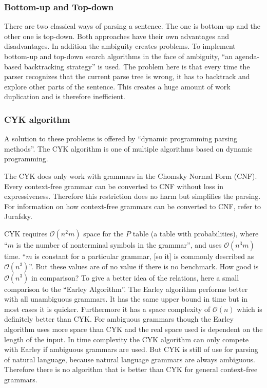 \documentclass[12pt,twoside]{scrartcl}
\theoremstyle{plain}
\theoremstyle{definition}
\theoremstyle{remark}
\begin{document}
		\subsubsection*{Bottom-up and Top-down}
		\label{subSubSec:bottomUpTopDown}
		
		There are two classical ways of parsing a sentence. The one is bottom-up and the other one is top-down. Both approaches have their own advantages and disadvantages. In addition the ambiguity creates problems. To implement bottom-up and top-down search algorithms in the face of ambiguity, ``an agenda-based backtracking strategy''\cite[p.~468]{Jurafsky2009b} is used. The problem here is that every time the parser recognizes that the current parse tree is wrong, it has to backtrack and explore other parts of the sentence. This creates a huge amount of work duplication and is therefore inefficient.
		
		\subsubsection*{CYK algorithm}
		\label{subSubSec:cykAlgorithm}		
		
		A solution to these problems is offered by ``dynamic programming parsing methods''\cite[p.~469]{Jurafsky2009b}. The CYK algorithm is one of multiple algorithms based on dynamic programming.
		
		The CYK does only work with grammars in the Chomsky Normal Form (CNF). Every context-free grammar can be converted to CNF without loss in expressiveness. Therefore this restriction does no harm but simplifies the parsing. For information on how context-free grammars can be converted to CNF, refer to Jurafsky\cite{Jurafsky2009b}.
		
		CYK requires $\mathcal{O}(n^{2}m)$ space for the $P$ table (a table with probabilities), where ``$m$ is the number of nonterminal symbols in the grammar''\cite[p.~893]{Russel2010}, and uses $\mathcal{O}(n^{3}m)$ time. ``$m$ is constant for a particular grammar, [so it] is commonly described as $\mathcal{O}(n^{3})$''\cite[p.~893]{Russel2010}. But these values are of no value if there is no benchmark. How good is $\mathcal{O}(n^{3})$ in comparison? To give a better idea of the relations, here a small comparison to the ``Earley Algorithm''\cite[p.~477]{Jurafsky2009b}. The Earley algorithm performs better with all unambiguous grammars.\cite{Li} It has the same upper bound in time but in most cases it is quicker. Furthermore it has a space complexity of $\mathcal{O}(n)$ which is definitely better than CYK.\cite{Li} For ambiguous grammars though the Earley algorithm uses more space than CYK and the real space used is dependent on the length of the input.\cite{Li} In time complexity the CYK algorithm can only compete with Earley if ambiguous grammars are used.\cite{Li} But CYK is still of use for parsing of natural language, because natural language grammars are always ambiguous. Therefore there is no algorithm that is better than CYK for general context-free grammars.\cite{Russel2010}
		
\end{document}

